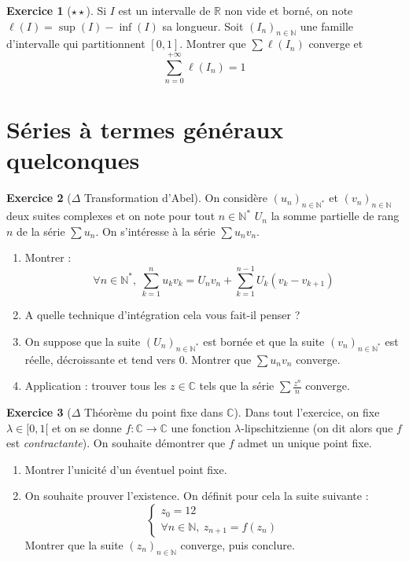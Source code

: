 \documentclass[french]{book}
\newcommand{\N}{\mathbb{N}}
\newcommand{\R}{\mathbb{R}}
\newcommand{\C}{\mathbb{C}}
\newcommand{\st}{^*}
\theoremstyle{definition}
\newtheorem{ex}{Exercice}[chapter]
\theoremstyle{theorem}
\theoremstyle{remark}
\begin{document}
\begin{ex}[$\star\star$]
	Si $I$ est un intervalle de $\R$ non vide et borné, on note $\ell(I)=\sup(I)-\inf(I)$ sa longueur. Soit $(I_n)_{n\in\N}$ une famille d'intervalle qui partitionnent $[0,1]$. Montrer que $\displaystyle\sum\ell(I_n)$ converge et $$\sum_{n=0}^{+\infty}\ell(I_n)=1$$
\end{ex}

\section{Séries à termes généraux quelconques}

\begin{ex}[$\Delta$ Transformation d'Abel]
	On considère $(u_n)_{n\in\N\st}$ et $(v_n)_{n\in\N}$ deux suites complexes et on note pour tout $n\in\N\st$ $U_n$ la somme partielle de rang $n$ de la série $\sum u_n$. On s'intéresse à la série $\sum u_nv_n$.
	\begin{enumerate}
		\item Montrer : $$\forall n\in\N\st,\ \sum_{k=1}^{n}u_kv_k=U_nv_n+\sum_{k=1}^{n-1}U_k(v_k-v_{k+1})$$
		\item A quelle technique d'intégration cela vous fait-il penser ?
		\item On suppose que la suite $(U_n)_{n\in\N\st}$ est bornée et que la suite $(v_n)_{n\in\N\st}$ est réelle, décroissante et tend vers $0$. Montrer que $\displaystyle\sum u_nv_n$ converge.
		\item Application : trouver tous les $z\in\C$ tels que la série $\displaystyle\sum\frac{z^n}{n}$ converge.
	\end{enumerate}
\end{ex}

\begin{ex}[$\Delta$ Théorème du point fixe dans $\C$]
	Dans tout l'exercice, on fixe $\lambda\in[0,1[$ et on se donne $f:\C\to\C$ une fonction $\lambda$-lipschitzienne (on dit alors que $f$ est \textit{contractante}). On souhaite démontrer que $f$ admet un unique point fixe.
	\begin{enumerate}
		\item Montrer l'unicité d'un éventuel point fixe.
		\item On souhaite prouver l'existence. On définit pour cela la suite suivante : 
		$$\begin{cases}
			z_0=12 \\
			\forall n\in\N,\ z_{n+1}=f(z_n)
		\end{cases}$$ Montrer que la suite $(z_n)_{n\in\N}$ converge, puis conclure.
	\end{enumerate}
\end{ex}
\end{document}

